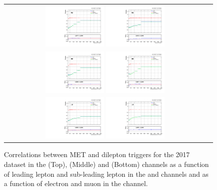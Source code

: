 \begin{figure}[htb]
  \begin{center}
    \begin{tabular}{cc}
      \includegraphics[width=0.30\textwidth]{fig_2017_TrigSF/g_lepApt_emu_alpha.pdf}
      \includegraphics[width=0.30\textwidth]{fig_2017_TrigSF/g_lepBpt_emu_alpha.pdf}\\
      \includegraphics[width=0.30\textwidth]{fig_2017_TrigSF/g_lepApt_ee_alpha.pdf}
      \includegraphics[width=0.30\textwidth]{fig_2017_TrigSF/g_lepBpt_ee_alpha.pdf}\\
      \includegraphics[width=0.30\textwidth]{fig_2017_TrigSF/g_lepApt_mumu_alpha.pdf}
      \includegraphics[width=0.30\textwidth]{fig_2017_TrigSF/g_lepBpt_mumu_alpha.pdf}\\
    \end{tabular}
    \caption{Correlations between MET and dilepton triggers for the 2017 dataset in the \emu (Top), \ee (Middle) and \mumu (Bottom) channels as a function of leading lepton \pT and sub-leading lepton \pT in the \ee and \mumu channels and as a function of electron \pT and muon \pT in the \emu channel.}
    \label{TrigSF_2017_5}
  \end{center}
\end{figure}


